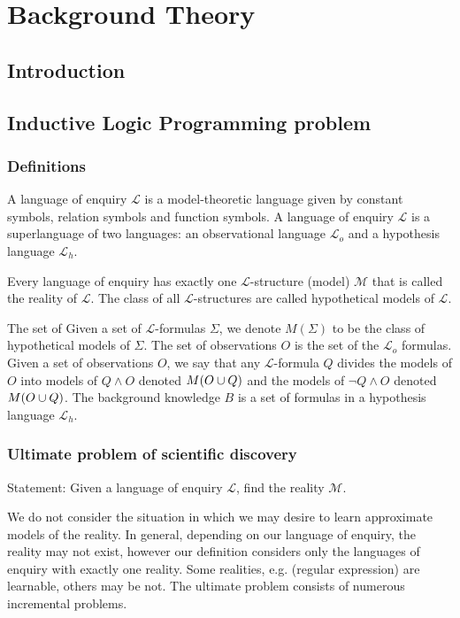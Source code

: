 
\chapter{Background Theory}

\label{ch:background}

\section{Introduction}

\section{Inductive Logic Programming problem}

\subsection{Definitions}

A language of enquiry $\mathcal{L}$ is a model-theoretic language given by constant symbols, relation symbols and function symbols. A language of enquiry $\mathcal{L}$ is a superlanguage of two languages: an observational language $\mathcal{L}_o$ and a hypothesis language $\mathcal{L}_h$.

Every language of enquiry has exactly one $\mathcal{L}$-structure (model) $\mathcal{M}$ that is called the reality of $\mathcal{L}$. The class of all $\mathcal{L}$-structures are called hypothetical models of $\mathcal{L}$.

The set of 
Given a set of $\mathcal{L}$-formulas $\Sigma$, we denote $M(\Sigma)$ to be the class of hypothetical models of $\Sigma$. The set of observations $O$ is the set of the $\mathcal{L}_o$ formulas.
Given a set of observations $O$, we say that any $\mathcal{L}$-formula $Q$ divides the models of $O$ into models of $Q \wedge O$ denoted $M(O \cup {Q})$ and the models of $\neg Q \wedge O$ denoted $M(O \cup {Q})$.
The background knowledge $B$ is a set of formulas in a hypothesis language $\mathcal{L}_h$.

\subsection{Ultimate problem of scientific discovery}
Statement: Given a language of enquiry $\mathcal{L}$, find the reality $\mathcal{M}$.

We do not consider the situation in which we may desire to learn approximate models of the reality. In general, depending on our language of enquiry, the reality may not exist, however our definition considers only the languages of enquiry with exactly one reality. Some realities, e.g. (regular expression) are learnable, others may be not. The ultimate problem consists of numerous incremental problems.

